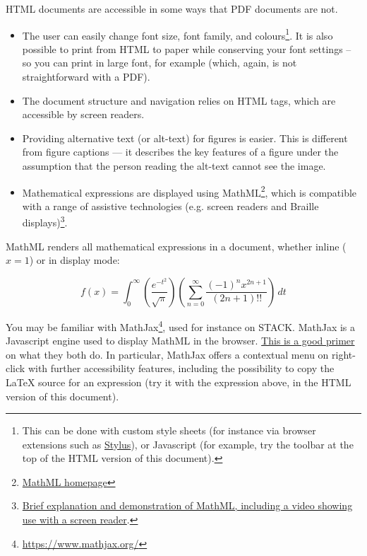 HTML documents are accessible in some ways that PDF documents are not.
\begin{itemize}
    \item The user can easily change font size, font family, and colours\footnote{This can be done with custom style sheets (for instance via browser extensions such as \href{https://add0n.com/stylus.html}{Stylus}), or Javascript (for example, try the toolbar at the top of the HTML version of this document).}. It is also possible to print from HTML to paper while conserving your font settings -- so you can print in large font, for example (which, again, is not straightforward with a PDF).
    \item The document structure and navigation relies on HTML tags, which are accessible by screen readers.
    \item Providing alternative text (or alt-text) for figures is easier. This is different from figure captions --- it describes the key features of a figure under the assumption that the person reading the alt-text cannot see the image.
    \item Mathematical expressions are displayed using MathML\footnote{\href{https://www.w3.org/Math/}{MathML homepage}}, which is compatible with a range of assistive technologies (e.g. screen readers and Braille displays)\footnote{\href{https://www.chhs.colostate.edu/accessibility/best-practices-how-tos/mathml/}{Brief explanation and demonstration of MathML, including a video showing use with a screen reader}.}.
\end{itemize}

MathML renders all mathematical expressions in a document, whether inline ($x = 1$) or in display mode:

\begin{equation}
    \label{eq:mathjax}
    f(x) = \int_{0}^{\infty} \left( \frac{e^{-t^2}}{\sqrt{\pi}} \right) \left( \sum_{n=0}^{\infty} \frac{(-1)^n x^{2n+1}}{(2n+1)!!} \right) \, dt
\end{equation}

You may be familiar with MathJax\footnote{\url{https://www.mathjax.org/}}, used for instance on STACK. MathJax is a Javascript engine used to display MathML in the browser. \href{https://andrewlock.net/rendering-math-in-html-mathml-mathml-core-and-asciimath/}{This is a good primer} on what they both do. In particular, MathJax offers a contextual menu on right-click with further accessibility features, including the possibility to copy the \LaTeX{} source for an expression (try it with the expression above, in the HTML version of this document).

